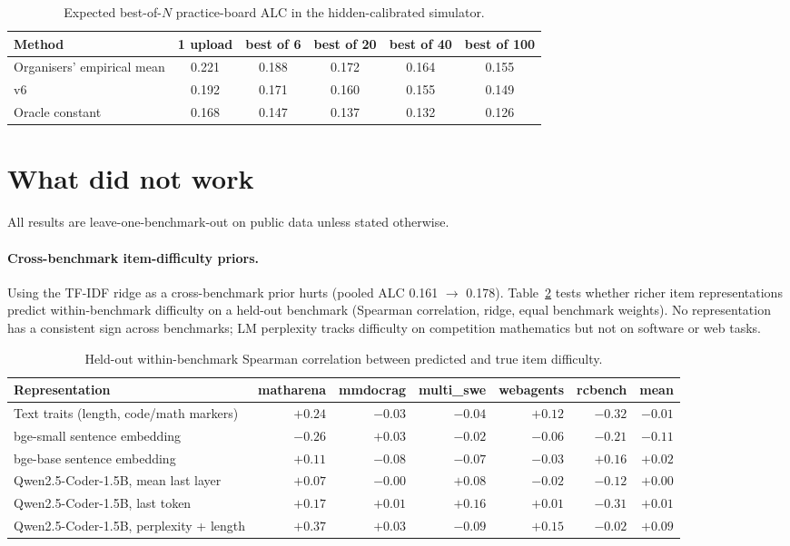 \documentclass{article}
\begin{document}
\begin{table}[h]
  \caption{Expected best-of-$N$ practice-board ALC in the hidden-calibrated simulator.}
  \label{tab:bestofn}
  \centering\small
  \begin{tabular}{lccccc}
    \toprule
    Method & 1 upload & best of 6 & best of 20 & best of 40 & best of 100 \\
    \midrule
    Organisers' empirical mean & 0.221 & 0.188 & 0.172 & 0.164 & 0.155 \\
    v6 & 0.192 & 0.171 & 0.160 & 0.155 & 0.149 \\
    Oracle constant & 0.168 & 0.147 & 0.137 & 0.132 & 0.126 \\
    \bottomrule
  \end{tabular}
\end{table}

\section{What did not work}
\label{sec:negative}

All results are leave-one-benchmark-out on public data unless stated otherwise.

\paragraph{Cross-benchmark item-difficulty priors.} Using the TF-IDF ridge as a cross-benchmark prior hurts (pooled ALC 0.161
$\to$ 0.178). Table~\ref{tab:xfer} tests whether richer item representations predict within-benchmark difficulty on a held-out
benchmark (Spearman correlation, ridge, equal benchmark weights). No representation has a consistent sign across benchmarks; LM
perplexity tracks difficulty on competition mathematics but not on software or web tasks.

\begin{table}[h]
  \caption{Held-out within-benchmark Spearman correlation between predicted and true item difficulty.}
  \label{tab:xfer}
  \centering\footnotesize\setlength{\tabcolsep}{4pt}
  \begin{tabular}{lrrrrrr}
    \toprule
    Representation & matharena & mmdocrag & multi\_swe & webagents & rcbench & mean \\
    \midrule
    Text traits (length, code/math markers) & $+0.24$ & $-0.03$ & $-0.04$ & $+0.12$ & $-0.32$ & $-0.01$ \\
    bge-small sentence embedding & $-0.26$ & $+0.03$ & $-0.02$ & $-0.06$ & $-0.21$ & $-0.11$ \\
    bge-base sentence embedding & $+0.11$ & $-0.08$ & $-0.07$ & $-0.03$ & $+0.16$ & $+0.02$ \\
    Qwen2.5-Coder-1.5B, mean last layer & $+0.07$ & $-0.00$ & $+0.08$ & $-0.02$ & $-0.12$ & $+0.00$ \\
    Qwen2.5-Coder-1.5B, last token & $+0.17$ & $+0.01$ & $+0.16$ & $+0.01$ & $-0.31$ & $+0.01$ \\
    Qwen2.5-Coder-1.5B, perplexity + length & $+0.37$ & $+0.03$ & $-0.09$ & $+0.15$ & $-0.02$ & $+0.09$ \\
    \bottomrule
  \end{tabular}
\end{table}
\end{document}
